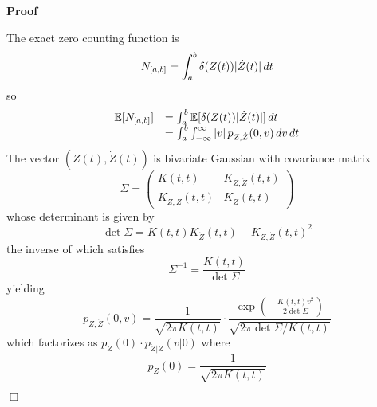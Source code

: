 \documentclass{article}
\newenvironment{proof}{\noindent\textbf{Proof\ }}{\hspace*{\fill}$\Box$\medskip}
\begin{document}
\begin{proof}
  
  \begin{enumerate}
    The exact zero counting function is
    \begin{equation}
      N_{[a, b]} = \int_a^b \delta (Z (t)) | \dot{Z} (t) |  \hspace{0.17em} dt
    \end{equation}
    so
    \begin{equation}
      \label{eq:expectation} \begin{array}{ll}
        \mathbb{E} [N_{[a, b]}] & = \int_a^b \mathbb{E} [\delta (Z (t)) |
        \dot{Z} (t) |]  \hspace{0.17em} dt\\
        & = \int_a^b \int_{- \infty}^{\infty} |v|  \hspace{0.17em} p_{Z,
        \dot{Z}} (0, v)  \hspace{0.17em} dv \hspace{0.17em} dt
      \end{array}
    \end{equation}
    The vector $(Z (t), \dot{Z} (t))$ is bivariate Gaussian with covariance
    matrix
    \begin{equation}
      \Sigma = \left(\begin{array}{cc}
        K (t, t) & K_{Z, \dot{Z}} (t, t)\\
        K_{Z, \dot{Z}} (t, t) & K_{\dot{Z}} (t, t)
      \end{array}\right)
    \end{equation}
    whose determinant is given by
    \begin{equation}
      \det \Sigma = K (t, t) K_{\dot{Z}} (t, t) - K_{Z, \dot{Z}} (t, t)^2
    \end{equation}
    the inverse of which satisfies
    \begin{equation}
      \Sigma^{- 1} = \frac{K (t, t)}{\det \Sigma}
    \end{equation}
    yielding
    \begin{equation}
      p_{Z, \dot{Z}} (0, v) = \frac{1}{\sqrt{2 \pi K (t, t)}} \cdot \frac{\exp
      \left( - \frac{K (t, t) v^2}{2 \det \Sigma} \right)}{\sqrt{2 \pi \det
      \Sigma / K (t, t)}}
    \end{equation}
    which factorizes as $p_Z (0) \cdot p_{\dot{Z} |Z} (v| 0)$ where
    \begin{equation}
      p_Z (0) = \frac{1}{\sqrt{2 \pi K (t, t)}}
    \end{equation}

\end{enumerate}
\end{proof}
\end{document}
